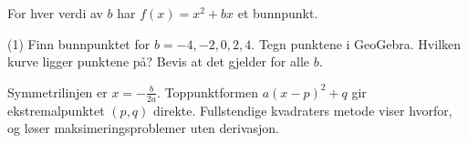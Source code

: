 For hver verdi av $b$ har $f(x) = x^2 + bx$ et bunnpunkt.
\begin{tasks}(1)
  \task Finn bunnpunktet for $b = -4, -2, 0, 2, 4$. Tegn punktene i GeoGebra.
  \task Hvilken kurve ligger punktene på? Bevis at det gjelder for alle $b$.
\end{tasks}

\begin{oppsummering}
Symmetrilinjen er $x = -\frac{b}{2a}$. Toppunktformen $a(x - p)^2 + q$ gir ekstremalpunktet $(p, q)$ direkte.
Fullstendige kvadraters metode viser hvorfor, og løser maksimeringsproblemer uten derivasjon.
\end{oppsummering}
